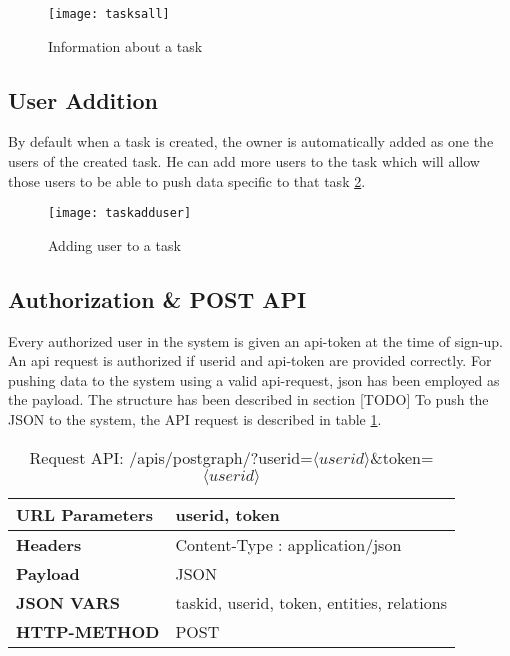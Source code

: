 \begin{figure}[H]
\begin{center}  
\texttt{[image: tasksall]} 
\caption{Information about a task}
\label{fig:tasksall}
\end{center}
\end{figure}


\subsection{User Addition}
By default when a task is created, the owner is automatically added as one the users of the created task.
He can add more users to the task which will allow those users to be able to push data specific to that task \ref{fig:taskadduser}.

\begin{figure}[H]
\begin{center}  
\texttt{[image: taskadduser]} 
\caption{Adding user to a task}
\label{fig:taskadduser}
\end{center}
\end{figure}


\subsection{Authorization \& POST API}
Every authorized user in the system is given an api-token at the time of sign-up. An api request is authorized if userid and api-token are provided correctly. For pushing data to the system using a valid api-request, json has been employed as the payload. The structure has been described in section [TODO]
To push the JSON to the system, the API request is described in table \ref{tab:postjson}.

\begin{table}[H]
\centering
\caption{Request API: /apis/postgraph/?userid=$\langle userid \rangle$\&token=$\langle userid \rangle$}
\label{tab:postjson}
\begin{tabular}{ll}

\textbf{URL Parameters} & userid, token                              \\

\hline

\textbf{Headers}        & Content-Type : application/json            \\

\hline

\textbf{Payload}        & JSON                                       \\

\hline

\textbf{JSON VARS}      & taskid, userid, token, entities, relations \\
\hline

\textbf{HTTP-METHOD}    & POST      \\
\hline                                

\end{tabular}
\end{table}

